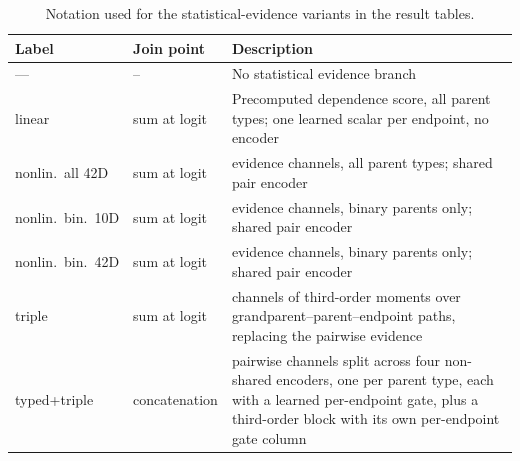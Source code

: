 \begin{table}[H]
  \centering
  \small
  \caption{Notation used for the statistical-evidence variants in the result tables.}
  \label{tab:hcr-legend}
  \begin{tabularx}{\textwidth}{l l >{\raggedright\arraybackslash}X}
    \toprule
    Label & Join point & Description \\
    \midrule
    ---
      & {--}
      & No statistical evidence branch \\
    \addlinespace[3pt]
    linear
      & sum at logit
      & Precomputed dependence score, all parent types; one learned scalar
        per endpoint, no encoder \\
    \addlinespace[3pt]
    nonlin.\ all 42D
      & sum at logit
      & 42 evidence channels, all parent types; shared pair encoder \\
    \addlinespace[3pt]
    nonlin.\ bin.\ 10D
      & sum at logit
      & 10 evidence channels, binary parents only; shared pair encoder \\
    \addlinespace[3pt]
    nonlin.\ bin.\ 42D
      & sum at logit
      & 42 evidence channels, binary parents only; shared pair encoder \\
    \addlinespace[3pt]
    triple
      & sum at logit
      & 13 channels of third-order moments over
        grandparent--parent--endpoint paths, replacing the pairwise
        evidence \\
    \addlinespace[3pt]
    typed+triple
      & concatenation
      & 42 pairwise channels split across four non-shared encoders, one per
        parent type, each with a learned per-endpoint gate, plus a
        third-order block with its own per-endpoint gate column \\
    \bottomrule
  \end{tabularx}
\end{table}

